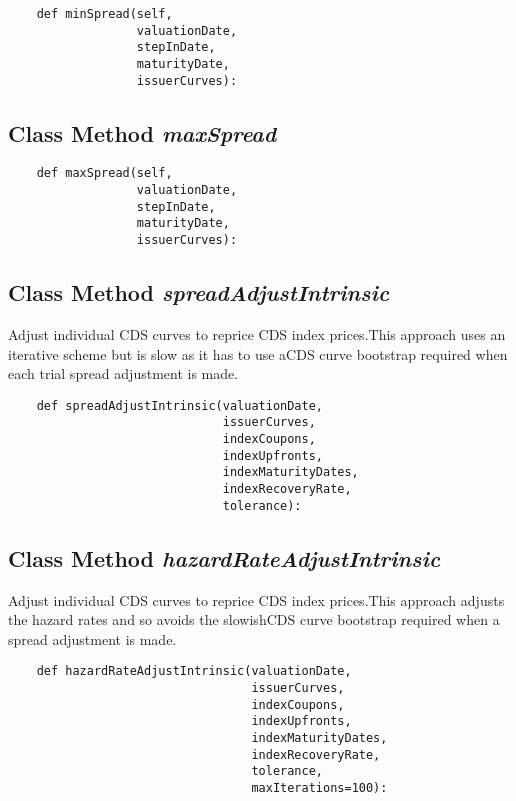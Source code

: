 \documentclass[twoside,11pt]{book}
\begin{document}
\begin{lstlisting}
    def minSpread(self,
                  valuationDate,
                  stepInDate,
                  maturityDate,
                  issuerCurves):
\end{lstlisting}

\subsection{Class Method {\it maxSpread}}


\begin{lstlisting}
    def maxSpread(self,
                  valuationDate,
                  stepInDate,
                  maturityDate,
                  issuerCurves):
\end{lstlisting}

\subsection{Class Method {\it spreadAdjustIntrinsic}}
Adjust individual CDS curves to reprice CDS index prices.This approach uses an iterative scheme but is slow as it has to use aCDS curve bootstrap required when each trial spread adjustment is made.

\begin{lstlisting}
    def spreadAdjustIntrinsic(valuationDate,
                              issuerCurves,
                              indexCoupons,
                              indexUpfronts,
                              indexMaturityDates,
                              indexRecoveryRate,
                              tolerance):
\end{lstlisting}

\subsection{Class Method {\it hazardRateAdjustIntrinsic}}
Adjust individual CDS curves to reprice CDS index prices.This approach adjusts the hazard rates and so avoids the slowishCDS curve bootstrap required when a spread adjustment is made.

\begin{lstlisting}
    def hazardRateAdjustIntrinsic(valuationDate,
                                  issuerCurves,
                                  indexCoupons,
                                  indexUpfronts,
                                  indexMaturityDates,
                                  indexRecoveryRate,
                                  tolerance,
                                  maxIterations=100):
\end{lstlisting}
\end{document}
